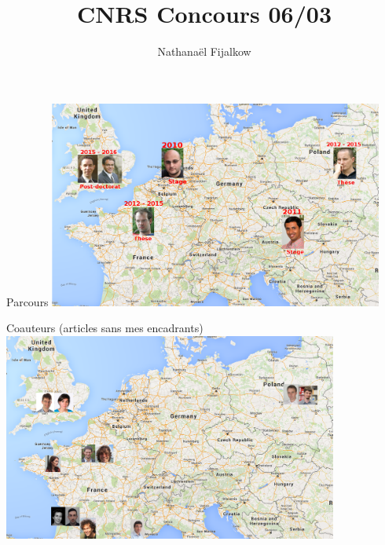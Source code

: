 \documentclass[svgnames]{beamer}
\title{CNRS Concours 06/03}
\subtitle{Nathana{\"e}l Fijalkow}
\institute{University of Oxford}
\date{}
\begin{document}
\addtocounter{framenumber}{-1}

\begin{frame}
  \titlepage
\end{frame}

\begin{frame}{Parcours}
\includegraphics[width=11cm]{Fig/Europe_pic_tag}
\end{frame}

\begin{frame}{Coauteurs (articles sans mes encadrants)}
\includegraphics[width=11cm]{Fig/Europe_collaborations}
\end{frame}
\end{document}
